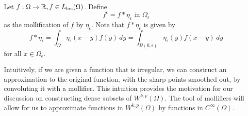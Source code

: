 \documentclass[10pt]{article}
\begin{document}
\begin{definition}
	Let $f: \Omega \to \mathbb{R}, f \in L_{\operatorname{loc}}(\Omega)$. Define 
	\begin{equation*}
		\displaystyle f^\epsilon = f * \eta_\epsilon \textrm{ in } \Omega_\epsilon 
	\end{equation*}
	as the mollification of $f$ by $\eta_\epsilon$. Note that $f * \eta_\epsilon$ is given by 
	\begin{equation*}
		\displaystyle f*\eta_\epsilon = \int_{\Omega}{\eta_{\epsilon}(x-y)f(y) \: dy} = \int_{B(0,\epsilon)}{\eta_{\epsilon}(y)f(x-y) \: dy}
	\end{equation*}
	for all $x \in \Omega_\epsilon$. 
\end{definition}
Intuitively, if we are given a function that is irregular, we can construct an approximation to the original function, with the sharp points smoothed out, by convoluting it with a mollifier. This intuition provides the motivation for our discussion on constructing dense subsets of $W^{k,p}(\Omega)$. The tool of mollifiers will allow for us to approximate functions in $W^{k,p}(\Omega)$ by functions in $C^{\infty}(\Omega)$. 
\end{document}
